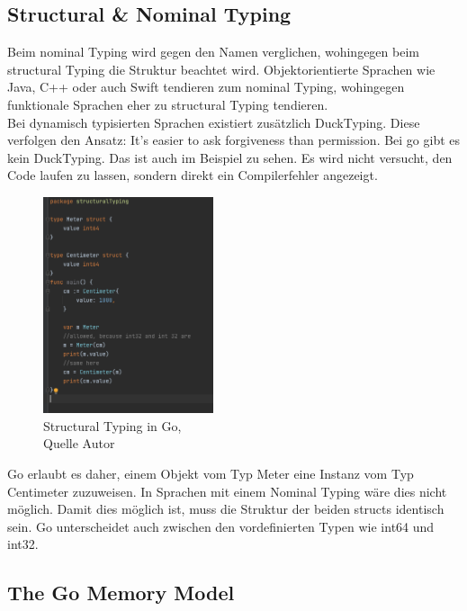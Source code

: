 \documentclass[12pt,titlepage]{article}
\begin{document}
\subsection{Structural \& Nominal Typing}
Beim nominal Typing wird gegen den Namen verglichen, wohingegen beim structural Typing die Struktur beachtet wird. Objektorientierte Sprachen wie Java, C++ oder auch Swift tendieren zum nominal Typing, wohingegen funktionale Sprachen eher zu structural Typing tendieren. \\
Bei dynamisch typisierten Sprachen existiert zusätzlich DuckTyping. Diese verfolgen den Ansatz: It's easier to ask forgiveness than permission. Bei go gibt es kein DuckTyping. Das ist auch im Beispiel zu sehen. Es wird nicht versucht, den Code laufen zu lassen, sondern direkt ein Compilerfehler angezeigt. 
\begin{figure}
	\centering
	\includegraphics[width=5cm]{structuralTyping}
	\caption{Structural Typing in Go, \\Quelle Autor}\label{structuralTyping}
\end{figure}
Go erlaubt es daher, einem Objekt vom Typ Meter eine Instanz vom Typ Centimeter zuzuweisen. In Sprachen mit einem Nominal Typing wäre dies nicht möglich. Damit dies möglich ist, muss die Struktur der beiden structs identisch sein. Go unterscheidet auch zwischen den vordefinierten Typen wie int64 und int32. 


\subsection{The Go Memory Model}
\end{document}
